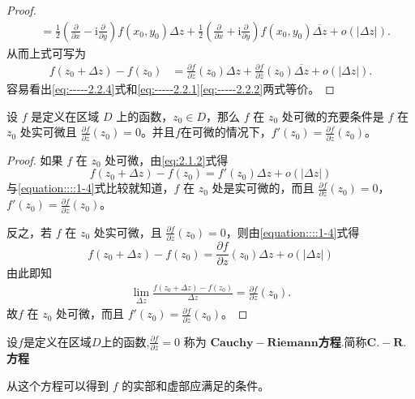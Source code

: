\documentclass[../../main.tex]{subfiles}%
\begin{document}
\begin{proof}
\begin{align*}
&= \frac{1}{2}\left( \frac{\partial}{\partial x} - \text{i}\frac{\partial}{\partial y} \right)f(x_0, y_0)\Delta z + \frac{1}{2}\left( \frac{\partial}{\partial x} + \text{i}\frac{\partial}{\partial y} \right)f(x_0, y_0)\overline{\Delta z} + o(|\Delta z|).
\end{align*}
从而上式可写为
\begin{align}\label{eq:-----2.2.4}
f(z_0 + \Delta z) - f(z_0) &= \frac{\partial f}{\partial z}(z_0)\Delta z + \frac{\partial f}{\partial \overline{z}}(z_0)\overline{\Delta z} + o(|\Delta z|).
\end{align}
容易看出\eqref{eq:-----2.2.4}式和\eqref{eq:-----2.2.1}\eqref{eq:-----2.2.2}两式等价。

\end{proof}

\begin{theorem}\label{theorem:复变函数可微的充要条件1}
设 \( f \) 是定义在区域 \( D \) 上的函数，\( z_0 \in D \)，那么 \( f \) 在 \( z_0 \) 处可微的充要条件是 \( f \) 在 \( z_0 \) 处实可微且 \( \frac{\partial f}{\partial \overline{z}}(z_0) = 0 \)。并且$f$在可微的情况下，\( f'(z_0) = \frac{\partial f}{\partial z}(z_0) \)。
\end{theorem}
\begin{proof}

如果 \( f \) 在 \( z_0 \) 处可微，由\eqref{eq:2.1.2}式得
\[
f(z_0 + \Delta z) - f(z_0) = f'(z_0)\Delta z + o(|\Delta z|)
\]
与\eqref{equation::::1-4}式比较就知道，\( f \) 在 \( z_0 \) 处是实可微的，而且 \( \frac{\partial f}{\partial \overline{z}}(z_0) = 0 \)，\( f'(z_0) = \frac{\partial f}{\partial z}(z_0) \)。

反之，若 \( f \) 在 \( z_0 \) 处实可微，且 \( \frac{\partial f}{\partial \overline{z}}(z_0) = 0 \)，则由\eqref{equation::::1-4}式得
\[
f(z_0 + \Delta z) - f(z_0) = \frac{\partial f}{\partial z}(z_0)\Delta z + o(|\Delta z|)
\]
由此即知 
\begin{align*}
\underset{\Delta z}{\lim}\frac{f\left( z_0+\Delta z \right) -f\left( z_0 \right)}{\Delta z}=\frac{\partial f}{\partial z}\left( z_0 \right).
\end{align*}
故\( f \) 在 \( z_0 \) 处可微，而且 \( f'(z_0) = \frac{\partial f}{\partial z}(z_0) \)。

\end{proof}

\begin{definition}
设$f$是定义在区域$D$上的函数,$\frac{\partial f}{\partial \overline{z}} = 0$ 称为 $\mathbf{Cauchy}-\mathbf{Riemann}$\textbf{方程}.简称$\mathbf{C}.-\mathbf{R}.$\textbf{方程}
\end{definition}
\begin{note}
从这个方程可以得到 $f$ 的实部和虚部应满足的条件。
\end{note}
\end{document}
